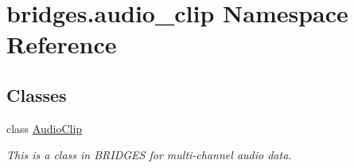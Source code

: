 \hypertarget{namespacebridges_1_1audio__clip}{}\section{bridges.\+audio\+\_\+clip Namespace Reference}
\label{namespacebridges_1_1audio__clip}
\subsection*{Classes}
\begin{DoxyCompactItemize}
\item 
class \mbox{\hyperlink{classbridges_1_1audio__clip_1_1_audio_clip}{Audio\+Clip}}
\begin{DoxyCompactList}\small\item\em This is a class in B\+R\+I\+D\+G\+ES for multi-\/channel audio data. \end{DoxyCompactList}\end{DoxyCompactItemize}
